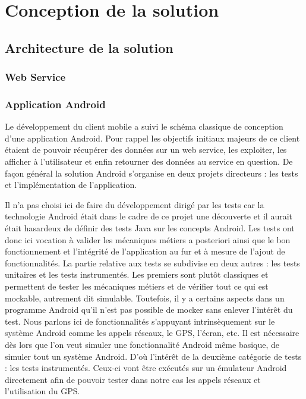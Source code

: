 \section{Conception de la solution}

\subsection{Architecture de la solution}

    \subsubsection{Web Service}

    \subsubsection{Application Android}
Le développement du client mobile a suivi le schéma classique de conception d’une application Android. Pour rappel les objectifs initiaux majeurs de ce client étaient de pouvoir récupérer des données sur un web service, les exploiter, les afficher à l’utilisateur et enfin retourner des données au service en question. De façon général la solution Android s’organise en deux projets directeurs : les tests et l’implémentation de l’application. 

Il n’a pas choisi ici de faire du développement dirigé par les tests car la technologie Android était dans le cadre de ce projet une découverte et il aurait était hasardeux de définir des tests Java sur les concepts Android. Les tests ont donc ici vocation à valider les mécaniques métiers a posteriori ainsi que le bon fonctionnement et l’intégrité de l’application au fur et à mesure de l’ajout de fonctionnalités. La partie relative aux tests se subdivise en deux autres : les tests unitaires et les tests instrumentés. Les premiers sont plutôt classiques et permettent de tester les mécaniques métiers et de vérifier tout ce qui est mockable, autrement dit simulable. Toutefois, il y a certains aspects dans un programme Android qu’il n’est pas possible de mocker sans enlever l’intérêt du test. Nous parlons ici de fonctionnalités s’appuyant intrinsèquement sur le système Android comme les appels réseaux, le GPS, l’écran, etc. Il est nécessaire dès lors que l’on veut simuler une fonctionnalité Android même basique, de simuler tout un système Android. D’où l’intérêt de la deuxième catégorie de tests : les tests instrumentés. Ceux-ci vont être exécutés sur un émulateur Android directement afin de pouvoir tester dans notre cas les appels réseaux et l’utilisation du GPS.

